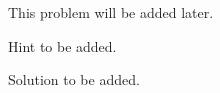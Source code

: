 
\begin{problem}
This problem will be added later.
\end{problem}

\begin{hint}
Hint to be added.
\end{hint}

\begin{solution}
Solution to be added.
\end{solution}
